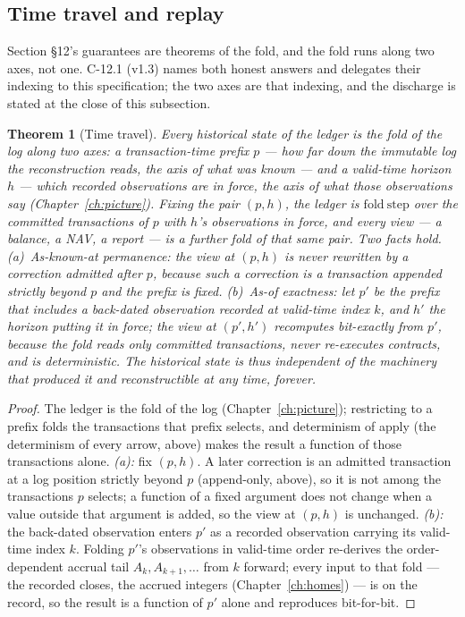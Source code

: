 \documentclass[11pt,a4paper]{article}
\newtheorem{theorem}[definition]{Theorem}
\begin{document}
\subsection{Time travel and replay}

Section \S 12's guarantees are theorems of the fold, and the fold runs along two axes, not
one. C-12.1 (v1.3) names both honest answers and delegates their indexing to this
specification; the two axes are that indexing, and the discharge is stated at the close of
this subsection.

\begin{theorem}[Time travel]\label{thm:timetravel}
Every historical state of the ledger is the fold of the log along two axes: a
transaction-time prefix $p$ --- how far down the immutable log the reconstruction reads,
the axis of what was known --- and a valid-time horizon $h$ --- which recorded observations
are in force, the axis of what those observations say (Chapter~\ref{ch:picture}). Fixing
the pair $(p,h)$, the ledger is $\mathrm{fold\ step}$ over the committed transactions of
$p$ with $h$'s observations in force, and every view --- a balance, a NAV, a report --- is
a further fold of that same pair. Two facts hold.
\emph{(a)~As-known-at permanence:} the view at $(p,h)$ is never rewritten by a correction
admitted after $p$, because such a correction is a transaction appended strictly beyond $p$
and the prefix is fixed.
\emph{(b)~As-of exactness:} let $p'$ be the prefix that includes a back-dated observation
recorded at valid-time index $k$, and $h'$ the horizon putting it in force; the view at
$(p',h')$ recomputes bit-exactly from $p'$, because the fold reads only committed
transactions, never re-executes contracts, and is deterministic. The historical state is
thus independent of the machinery that produced it and reconstructible at any time, forever.
\end{theorem}

\begin{proof}
The ledger is the fold of the log (Chapter~\ref{ch:picture}); restricting to a prefix folds
the transactions that prefix selects, and determinism of apply (the determinism of every
arrow, above) makes the result a function of those transactions alone. \emph{(a):} fix
$(p,h)$. A later correction is an admitted transaction at a log position strictly beyond $p$
(append-only, above), so it is not among the transactions $p$ selects; a function of a fixed
argument does not change when a value outside that argument is added, so the view at $(p,h)$
is unchanged. \emph{(b):} the back-dated observation enters $p'$ as a recorded observation
carrying its valid-time index $k$. Folding $p'$'s observations in valid-time order re-derives
the order-dependent accrual tail $A_k, A_{k+1}, \dots$ from $k$ forward; every input to that
fold --- the recorded closes, the accrued integers (Chapter~\ref{ch:homes}) --- is on the
record, so the result is a function of $p'$ alone and reproduces bit-for-bit.
\end{proof}
\end{document}
